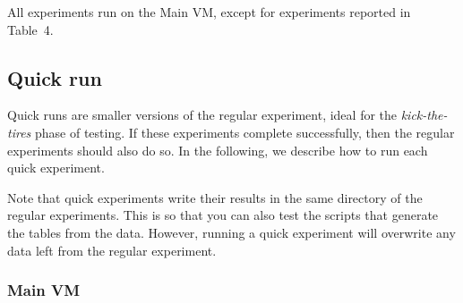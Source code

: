 \documentclass[12pt]{article}
\begin{document}
All experiments run on the Main VM, except for experiments reported in Table~4.

\subsection{Quick run}

Quick runs are smaller versions of the regular experiment, ideal for the
\emph{kick-the-tires} phase of testing.  If these experiments complete
successfully, then the regular experiments should also do so.  In the following,
we describe how to run each quick experiment.

Note that quick experiments write their results in the same directory of the
regular experiments.  This is so that you can also test the scripts that
generate the tables from the data.  However, running a quick experiment will
overwrite any data left from the regular experiment.

\subsubsection{Main VM}
\end{document}
